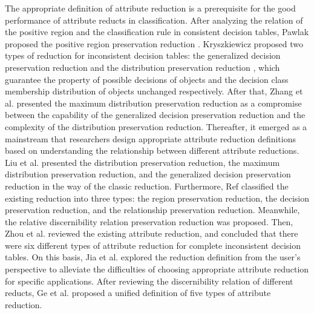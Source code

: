 \documentclass[review]{elsarticle}
\begin{document}
	\par The appropriate definition of attribute reduction is a prerequisite for the good performance of attribute reducts in classification. After analyzing the relation of the positive region and the classification rule in consistent decision tables, Pawlak proposed the positive region preservation reduction \cite{Pawlak1982}. Kryszkiewicz proposed two types of reduction for inconsistent decision tables: the generalized decision preservation reduction and the distribution preservation reduction \cite{kryszkiewicz2001comparative}, which guarantee the property of possible decisions of objects and the decision class membership distribution of objects unchanged respectively. After that, Zhang et al. \cite{zhang2003knowledge} presented the maximum distribution preservation reduction as a compromise between the capability of the generalized decision preservation reduction and the complexity of the distribution preservation reduction. Thereafter, it emerged as a mainstream that researchers design appropriate attribute reduction definitions based on understanding the relationship between different attribute reductions. Liu et al. \cite{liu2006knowledge} presented the distribution preservation reduction, the maximum distribution preservation reduction, and the generalized decision preservation reduction in the way of the classic reduction. Furthermore, Ref \cite{miao2009relative} classified the existing reduction into three types: the region preservation reduction, the decision preservation reduction, and the relationship preservation reduction. Meanwhile, the relative discernibility relation preservation reduction was proposed. Then, Zhou et al. \cite{zhou2011analysis} reviewed the existing attribute reduction, and concluded that there were six different types of attribute reduction for complete inconsistent decision tables. On this basis, Jia et al. \cite{jia2016generalized} explored the reduction definition from the user's perspective to alleviate the difficulties of choosing appropriate attribute reduction for specific applications. After reviewing the discernibility relation of different reducts, Ge et al. \cite{ge2017quick} proposed a unified definition of five types of attribute reduction.
	
\end{document}
